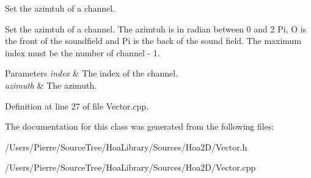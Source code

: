 Set the azimtuh of a channel. 

Set the azimtuh of a channel. The azimtuh is in radian between 0 and 2 Pi, O is the front of the soundfield and Pi is the back of the sound field. The maximum index must be the number of channel -\/ 1.


\begin{DoxyParams}{Parameters}
{\em index} & The index of the channel. \\
\hline
{\em azimuth} & The azimuth. \\
\hline
\end{DoxyParams}


Definition at line 27 of file Vector.\-cpp.



The documentation for this class was generated from the following files\-:\begin{DoxyCompactItemize}
\item 
/\-Users/\-Pierre/\-Source\-Tree/\-Hoa\-Library/\-Sources/\-Hoa2\-D/Vector.\-h\item 
/\-Users/\-Pierre/\-Source\-Tree/\-Hoa\-Library/\-Sources/\-Hoa2\-D/Vector.\-cpp\end{DoxyCompactItemize}
